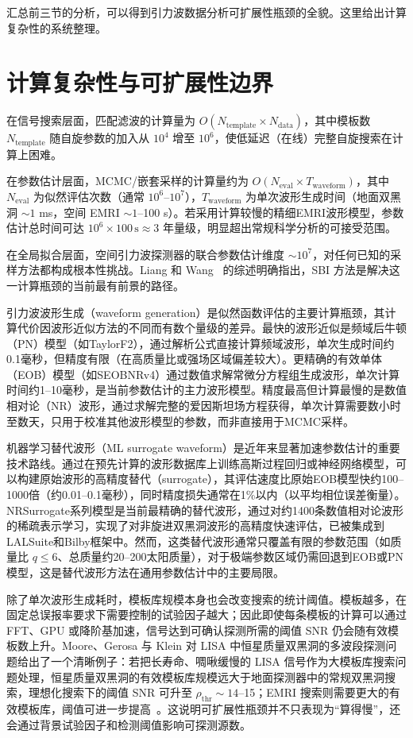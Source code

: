 汇总前三节的分析，可以得到引力波数据分析可扩展性瓶颈的全貌。这里给出计算复杂性的系统整理。

\section{计算复杂性与可扩展性边界}

在信号搜索层面，匹配滤波的计算量为 $O(N_\mathrm{template} \times N_\mathrm{data})$，其中模板数 $N_\mathrm{template}$ 随自旋参数的加入从 $10^4$ 增至 $10^6$，使低延迟（在线）完整自旋搜索在计算上困难。

在参数估计层面，MCMC/嵌套采样的计算量约为 $O(N_\mathrm{eval} \times T_\mathrm{waveform})$，其中 $N_\mathrm{eval}$ 为似然评估次数（通常 $10^6$--$10^7$），$T_\mathrm{waveform}$ 为单次波形生成时间（地面双黑洞 $\sim 1$ ms，空间 EMRI $\sim 1$--100 s）。若采用计算较慢的精细EMRI波形模型，参数估计总时间可达 $10^6 \times 100\,\mathrm{s} \approx 3$ 年量级，明显超出常规科学分析的可接受范围。

在全局拟合层面，空间引力波探测器的联合参数估计维度 $\sim 10^7$，对任何已知的采样方法都构成根本性挑战。Liang 和 Wang~\cite{liang2026sbireview} 的综述明确指出，SBI 方法是解决这一计算瓶颈的当前最有前景的路径。

引力波波形生成（waveform generation）是似然函数评估的主要计算瓶颈，其计算代价因波形近似方法的不同而有数个量级的差异。最快的波形近似是频域后牛顿（PN）模型（如TaylorF2），通过解析公式直接计算频域波形，单次生成时间约0.1毫秒，但精度有限（在高质量比或强场区域偏差较大）。更精确的有效单体（EOB）模型（如SEOBNRv4）通过数值求解常微分方程组生成波形，单次计算时间约1--10毫秒，是当前参数估计的主力波形模型。精度最高但计算最慢的是数值相对论（NR）波形，通过求解完整的爱因斯坦场方程获得，单次计算需要数小时至数天，只用于校准其他波形模型的参数，而非直接用于MCMC采样。

机器学习替代波形（ML surrogate waveform）是近年来显著加速参数估计的重要技术路线。通过在预先计算的波形数据库上训练高斯过程回归或神经网络模型，可以构建原始波形的高精度替代（surrogate），其评估速度比原始EOB模型快约100--1000倍（约0.01--0.1毫秒），同时精度损失通常在1\%以内（以平均相位误差衡量）。NRSurrogate系列模型是当前最精确的替代波形，通过对约1400条数值相对论波形的稀疏表示学习，实现了对非旋进双黑洞波形的高精度快速评估，已被集成到LALSuite和Bilby框架中。然而，这类替代波形通常只覆盖有限的参数范围（如质量比 $q \leq 6$、总质量约20--200太阳质量），对于极端参数区域仍需回退到EOB或PN模型，这是替代波形方法在通用参数估计中的主要局限。

除了单次波形生成耗时，模板库规模本身也会改变搜索的统计阈值。模板越多，在固定总误报率要求下需要控制的试验因子越大；因此即使每条模板的计算可以通过 FFT、GPU 或降阶基加速，信号达到可确认探测所需的阈值 SNR 仍会随有效模板数上升。Moore、Gerosa 与 Klein 对 LISA 中恒星质量双黑洞的多波段探测问题给出了一个清晰例子：若把长寿命、啁啾缓慢的 LISA 信号作为大模板库搜索问题处理，恒星质量双黑洞的有效模板库规模远大于地面探测器中的常规双黑洞搜索，理想化搜索下的阈值 SNR 可升至 $\rho_\mathrm{thr}\sim14$--15；EMRI 搜索则需要更大的有效模板库，阈值可进一步提高~\cite{Moore2019StellarMassLISA}。这说明可扩展性瓶颈并不只表现为“算得慢”，还会通过背景试验因子和检测阈值影响可探测源数。

